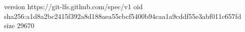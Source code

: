 version https://git-lfs.github.com/spec/v1
oid sha256:a1d8a2bc2415f392a8d188aea55cbcf5400b94caa1a9cddf55e3abf011c657fd
size 29670
